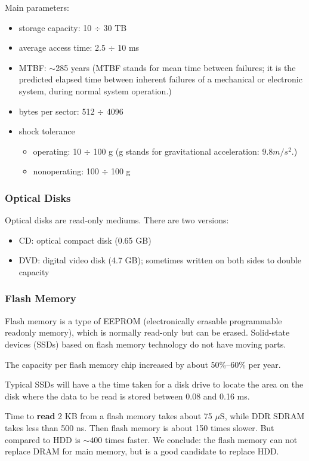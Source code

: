 Main parameters:
\begin{itemize}
    \item storage capacity: 10 $\div$ 30 TB
    \item average access time: 2.5 $\div$ 10 ms
    \item MTBF: $\sim$285 years (MTBF stands for mean time between failures; it is the predicted elapsed time between inherent failures of a mechanical or electronic system, during normal system operation.)
    \item bytes per sector: 512 $\div$ 4096
    \item shock tolerance
        \begin{itemize}
            \item operating: 10 $\div$ 100 g (g stands for gravitational acceleration: $9.8 m/s^2$.)
            \item nonoperating: 100 $\div$ 100 g
        \end{itemize}
\end{itemize}

\subsubsection{Optical Disks}

Optical disks are read-only mediums. There are two versions:
\begin{itemize}
    \item CD: optical compact disk (0.65 GB)
    \item DVD: digital video disk (4.7 GB); sometimes written on both sides to double capacity
\end{itemize}

\subsubsection{Flash Memory}


Flash memory is a type of EEPROM (electronically erasable programmable readonly memory), which is normally read-only but can be erased. Solid-state devices (SSDs) based on flash memory technology do not have moving parts.

The capacity per flash memory chip increased by about 50\%–60\% per year.

Typical SSDs will have a the time taken for a disk drive to locate the area on the disk where the data to be read is stored between 0.08 and 0.16 ms.

Time to {\bf read} 2 KB from a flash memory takes about 75 $\mu$S,  while DDR SDRAM takes less than 500 ns. Then  flash memory is  about 150 times slower. But compared to HDD is $\sim 400$  times faster. We conclude: the flash memory can not replace DRAM for main memory, but is a good candidate to replace HDD.

